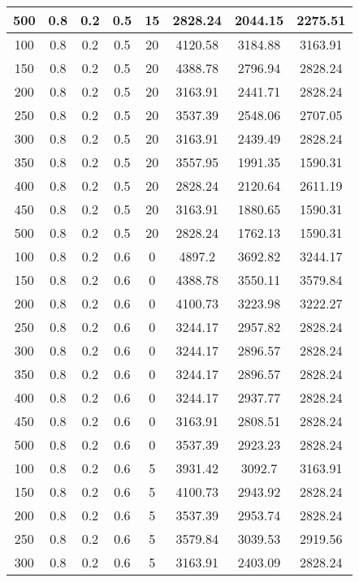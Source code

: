 \documentclass[a4paper, 12pt]{extreport}
\begin{document}
\begin{itemize}
\begin{longtable}{|c|c|c|c|c|c|c|c|}
			500 & 0.8 & 0.2 & 0.5 & 15 & 2828.24 & 2044.15 & 2275.51 \\\hline
			100 & 0.8 & 0.2 & 0.5 & 20 & 4120.58 & 3184.88 & 3163.91 \\\hline
			150 & 0.8 & 0.2 & 0.5 & 20 & 4388.78 & 2796.94 & 2828.24 \\\hline
			200 & 0.8 & 0.2 & 0.5 & 20 & 3163.91 & 2441.71 & 2828.24 \\\hline
			250 & 0.8 & 0.2 & 0.5 & 20 & 3537.39 & 2548.06 & 2707.05 \\\hline
			300 & 0.8 & 0.2 & 0.5 & 20 & 3163.91 & 2439.49 & 2828.24 \\\hline
			350 & 0.8 & 0.2 & 0.5 & 20 & 3557.95 & 1991.35 & 1590.31 \\\hline
			400 & 0.8 & 0.2 & 0.5 & 20 & 2828.24 & 2120.64 & 2611.19 \\\hline
			450 & 0.8 & 0.2 & 0.5 & 20 & 3163.91 & 1880.65 & 1590.31 \\\hline
			500 & 0.8 & 0.2 & 0.5 & 20 & 2828.24 & 1762.13 & 1590.31 \\\hline
			100 & 0.8 & 0.2 & 0.6 & 0 & 4897.2 & 3692.82 & 3244.17 \\\hline
			150 & 0.8 & 0.2 & 0.6 & 0 & 4388.78 & 3550.11 & 3579.84 \\\hline
			200 & 0.8 & 0.2 & 0.6 & 0 & 4100.73 & 3223.98 & 3222.27 \\\hline
			250 & 0.8 & 0.2 & 0.6 & 0 & 3244.17 & 2957.82 & 2828.24 \\\hline
			300 & 0.8 & 0.2 & 0.6 & 0 & 3244.17 & 2896.57 & 2828.24 \\\hline
			350 & 0.8 & 0.2 & 0.6 & 0 & 3244.17 & 2896.57 & 2828.24 \\\hline
			400 & 0.8 & 0.2 & 0.6 & 0 & 3244.17 & 2937.77 & 2828.24 \\\hline
			450 & 0.8 & 0.2 & 0.6 & 0 & 3163.91 & 2808.51 & 2828.24 \\\hline
			500 & 0.8 & 0.2 & 0.6 & 0 & 3537.39 & 2923.23 & 2828.24 \\\hline
			100 & 0.8 & 0.2 & 0.6 & 5 & 3931.42 & 3092.7 & 3163.91 \\\hline
			150 & 0.8 & 0.2 & 0.6 & 5 & 4100.73 & 2943.92 & 2828.24 \\\hline
			200 & 0.8 & 0.2 & 0.6 & 5 & 3537.39 & 2953.74 & 2828.24 \\\hline
			250 & 0.8 & 0.2 & 0.6 & 5 & 3579.84 & 3039.53 & 2919.56 \\\hline
			300 & 0.8 & 0.2 & 0.6 & 5 & 3163.91 & 2403.09 & 2828.24 \\\hline

\end{longtable}
\end{itemize}
\end{document}
